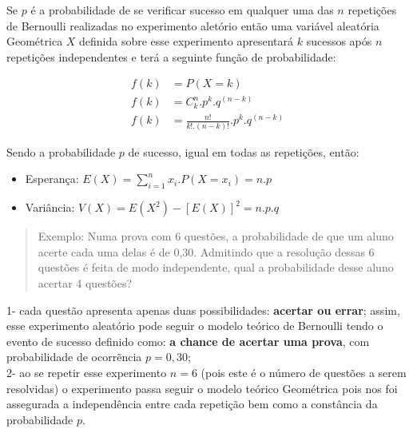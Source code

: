 \documentclass[
]{book}
\providecommand{\tightlist}{%
  \setlength{\itemsep}{0pt}\setlength{\parskip}{0pt}}
\begin{document}
Se \(p\) é a probabilidade de se verificar sucesso em qualquer uma das \(n\) repetições de Bernoulli realizadas no experimento aletório então uma variável aleatória Geométrica \(X\) definida sobre esse experimento apresentará \(k\) sucessos após \(n\) repetições independentes e terá a seguinte função de probabilidade:

\hfill\break

\begin{align*}
f(k) & = P(X=k)  \\
f(k) & = {C}_{k}^{n}. {p}^{k}. {q}^{(n-k)} \\
f(k) & = \frac{n!}{k!. (n-k)!} . {p}^{k}. {q}^{(n-k)}   
\end{align*}

\hfill\break

Sendo a probabilidade \(p\) de sucesso, igual em todas as repetições, então:

\hfill\break

\begin{itemize}
\tightlist
\item
  Esperança: \(E\left(X\right)=\sum _{i=1}^{n}{x}_{i}. P\left(X={x}_{i}\right)=n. p\)\\
\item
  Variância: \(V\left(X\right)=E\left({X}^{2}\right)-{\left[E\left(X\right)\right]}^{2} = n . p . q\)
\end{itemize}

\hfill\break

\begin{quote}
Exemplo: Numa prova com 6 questões, a probabilidade de que um aluno acerte cada uma delas é de 0,30. Admitindo que a resolução dessas 6 questões é feita de modo independente, qual a probabilidade desse aluno acertar 4 questões?
\end{quote}

\hfill\break

1- cada questão apresenta apenas duas possibilidades: \textbf{acertar ou errar}; assim, esse experimento aleatório pode seguir o modelo teórico de Bernoulli tendo o evento de sucesso definido como: \textbf{a chance de acertar uma prova}, com probabilidade de ocorrẽncia \(p=0,30\);\\
2- ao se repetir esse experimento \(n=6\) (pois este é o número de questões a serem resolvidas) o experimento passa seguir o modelo teórico Geométrica pois nos foi assegurada a independência entre cada repetição bem como a constância da probabilidade \(p\).

\hfill\break
\end{document}
